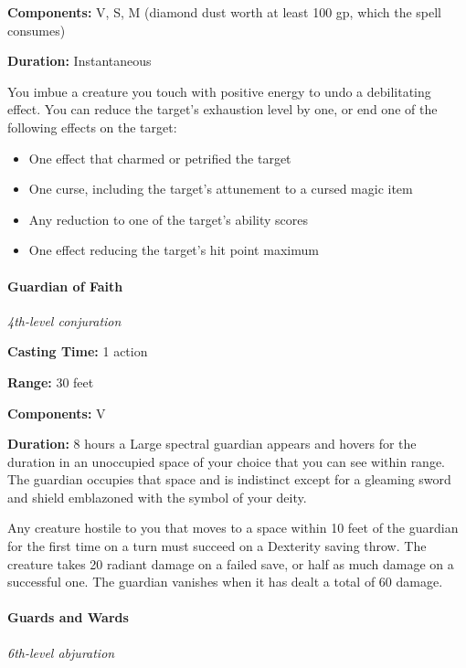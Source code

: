 \documentclass[
]{article}
\providecommand{\tightlist}{%
  \setlength{\itemsep}{0pt}\setlength{\parskip}{0pt}}
\begin{document}
\textbf{Components:} V, S, M (diamond dust worth at least 100 gp, which
the spell consumes)

\textbf{Duration:} Instantaneous

You imbue a creature you touch with positive energy to undo a
debilitating effect. You can reduce the target's exhaustion level by
one, or end one of the following effects on the target:

\begin{itemize}
\tightlist
\item
  One effect that charmed or petrified the target
\item
  One curse, including the target's attunement to a cursed magic item
\item
  Any reduction to one of the target's ability scores
\item
  One effect reducing the target's hit point maximum
\end{itemize}

\hypertarget{guardian-of-faith}{%
\paragraph{Guardian of Faith}\label{guardian-of-faith}}

\emph{4th-level conjuration}

\textbf{Casting Time:} 1 action

\textbf{Range:} 30 feet

\textbf{Components:} V

\textbf{Duration:} 8 hours a Large spectral guardian appears and hovers
for the duration in an unoccupied space of your choice that you can see
within range. The guardian occupies that space and is indistinct except
for a gleaming sword and shield emblazoned with the symbol of your
deity.

Any creature hostile to you that moves to a space within 10 feet of the
guardian for the first time on a turn must succeed on a Dexterity saving
throw. The creature takes 20 radiant damage on a failed save, or half as
much damage on a successful one. The guardian vanishes when it has dealt
a total of 60 damage.

\hypertarget{guards-and-wards}{%
\paragraph{Guards and Wards}\label{guards-and-wards}}

\emph{6th-level abjuration}
\end{document}
